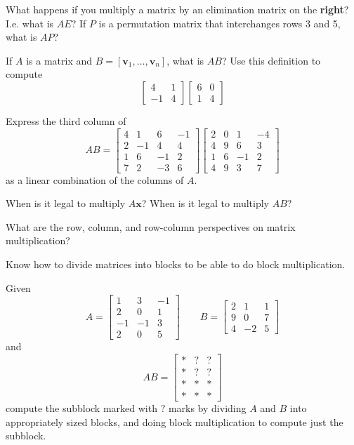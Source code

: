 \documentclass[minion]{homework}
\newcommand{\vx}{\mathbf{x}}
\newcommand{\vv}{\mathbf{v}}
\begin{document}
What happens if you multiply a matrix by an elimination matrix on the {\bf right}?  I.e. what is $AE$?  If $P$ is a permutation matrix that interchanges rows 3
and 5, what is $AP$?

If $A$ is a matrix and $B=[\vv_1,\ldots,\vv_n]$, what is $AB$? 
Use this definition to compute
$$
\begin{bmatrix} 4 & 1\\ -1 & 4\end{bmatrix} \begin{bmatrix} 6 &0 \\ 1 & 4\end{bmatrix}
$$

Express the third column of
$$
AB=\begin{bmatrix} 4 & 1 & 6& -1\\ 2& -1 & 4& 4 \\ 1 & 6 & -1& 2 \\ 7 & 2 & -3 & 6\end{bmatrix} \begin{bmatrix} 2 & 0 & 1& -4\\ 4& 9 & 6& 3 \\ 1 & 6& -1& 2 \\  4& 9 & 3& 7\end{bmatrix} 
$$
as a linear combination of the columns of $A$.

When is it legal to multiply $A\vx$?  When is it legal to multiply $AB$?

What are the row, column, and row-column perspectives on matrix multiplication?

Know how to divide matrices into blocks to be able to do block multiplication.

Given
$$
A=\begin{bmatrix} 1 & 3 & -1\\ 2 & 0 &1 \\ -1 & -1 & 3 \\ 2 & 0 & 5\end{bmatrix}\qquad
B=\begin{bmatrix} 2 & 1 & 1\\ 9 & 0 &7 \\ 4 & -2 & 5\end{bmatrix}
$$
and
$$
AB=\begin{bmatrix} * & ? & ?\\ * & ? &? \\ * & * & *\\ * & * & *\end{bmatrix}
$$
compute the subblock marked with $?$ marks by dividing $A$ and $B$ into appropriately sized blocks, and doing block multiplication to compute just the
subblock.
\end{document}
